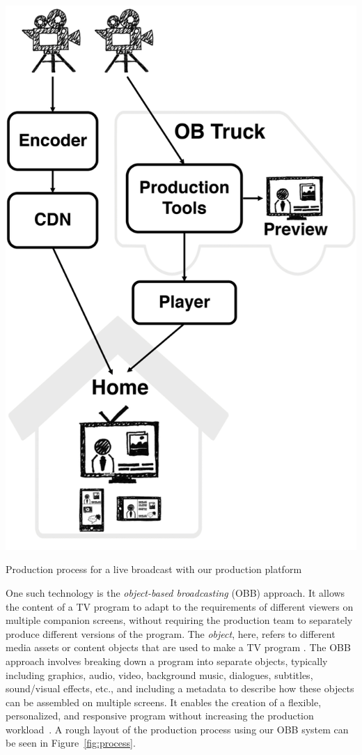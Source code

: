 \documentclass[sigchi-a, authorversion]{acmart}
\begin{document}
\begin{marginfigure}
    \vspace{-12pc}
    \includegraphics[width=\marginparwidth]{Figures/process.png}
    \caption{Production process for a live broadcast with our production platform}
    \label{fig:process}
\end{marginfigure}

One such technology is the \emph{object-based broadcasting} (OBB) approach.
It allows the content of a TV program to
adapt to the requirements of different viewers on multiple companion screens,
without requiring the production team to separately produce different versions
of the program. The \emph{object}, here, refers to different media assets or content
objects that are used to make a TV program \cite{armstrong2014}. The OBB approach
involves breaking down a program into separate objects, typically including
graphics, audio, video, background music, dialogues, subtitles, sound/visual
effects, etc., and including a metadata to describe how these objects can be
assembled on multiple screens. It enables the creation of a flexible, personalized,
and responsive program without increasing the production
workload~\cite{kegel2017, williams2016}. A rough layout of the production process
using our OBB system can be seen in Figure~\ref{fig:process}.
\end{document}
